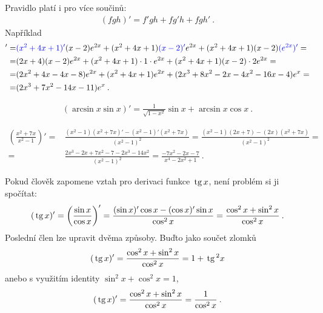 \begin{example}
    Pravidlo platí i pro více součinů:
    \begin{align}
        (fgh)' = f'gh+fg'h+fgh' \:.
    \end{align}
    Například
    \begin{align}
        [(x^2+4x+1)(x-2)e^{2x}]' =& \textcolor{blue}{(x^2+4x+1)'}(x-2)e^{2x} + (x^2+4x+1)\textcolor{blue}{(x-2)'}e^{2x} + (x^2+4x+1)(x-2) \textcolor{blue}{(e^{2x})'} = \\
        =& (2x + 4)(x-2)e^{2x} + (x^2+4x+1) \cdot 1 \cdot e^{2x} + (x^2+4x+1)(x-2) \cdot 2e^{2x} = \\
        =& (2x^2+4x-4x-8) e^{2x} + (x^2+4x+1) e^{2x} + (2x^3+8x^2-2x-4x^2-16x-4)e^x = \\
        =& (2x^3 + 7x^2 - 14x - 11) e^x \:.
    \end{align}
\end{example}

\begin{example}
    \begin{align}
        (\arcsin x \sin x)' = \frac{1}{\sqrt{1-x^2}} \sin x + \arcsin x \cos x \:. 
    \end{align}
\end{example}

\begin{example}
    \begin{align}
        \left( \frac{x^2+7x}{x^2-1} \right)' =& \frac{(x^2-1)(x^2+7x)'-(x^2-1)'(x^2+7x)}{(x^2-1)^2} = 
        \frac{(x^2-1)(2x+7)-(2x)(x^2+7x)}{(x^2-1)^2} = \\
        =&
        \frac{2x^3 - 2x + 7x^2 - 7 - 2x^3 - 14 x^2}{(x^2-1)^2} =
        \frac{-7x^2 - 2x - 7}{x^4 - 2x^2 + 1} \:.
    \end{align}
\end{example}

\begin{example}
    Pokud člověk zapomene vztah pro derivaci funkce $\,\mathrm{tg}\, x$, není problém si ji spočítat:
    \begin{align}
        (\,\mathrm{tg}\, x)' = \left( \frac{\sin x}{\cos x} \right)' = \frac{(\sin x)' \cos x - (\cos x)' \sin x}{\cos^2 x} = \frac{\cos^2 x + \sin^2 x}{\cos^2 x}\:.
    \end{align}
    Poslední člen lze upravit dvěma způsoby. Buďto jako součet zlomků
    \begin{align}
        (\,\mathrm{tg}\, x)' = \frac{\cos^2 x + \sin^2 x}{\cos^2 x} = 1 + \,\mathrm{tg}\,^2 x 
    \end{align}
    anebo s využitím identity $\sin^2 x + \cos^2 x = 1$,
    \begin{align}
        (\,\mathrm{tg}\, x)' = \frac{\cos^2 x + \sin^2 x}{\cos^2 x} = \frac{1}{\cos^2 x} \:.
    \end{align}
\end{example}